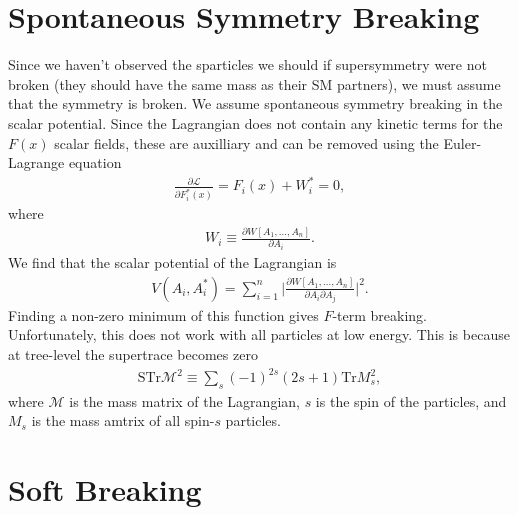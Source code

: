 \documentclass[twoside,english]{uiofysmaster}
\begin{document}
\section{Spontaneous Symmetry Breaking}

Since we haven't observed the sparticles we should if supersymmetry were not broken (they should have the same mass as their SM partners), we must assume that the symmetry is broken. We assume spontaneous symmetry breaking in the scalar potential. Since the Lagrangian does not contain any kinetic terms for the $F(x)$ scalar fields, these are auxilliary and can be removed using the Euler-Lagrange equation
\begin{align}
\frac{\partial \mathcal{L}}{\partial F_i^*(x)} = F_i(x) + W_i^* = 0,
\end{align}
where
\begin{align}
W_i \equiv \frac{\partial W[A_1,...,A_n]}{\partial A_i}.
\end{align}
We find that the scalar potential of the Lagrangian is 
\begin{align}
V(A_i, A_i^*) = \sum_{i=1}^n \Bigg| \frac{\partial W [A_1,...,A_n]}{\partial A_i \partial A_j} \Bigg|^2.
\end{align}
Finding a non-zero minimum of this function gives $F$-term breaking. Unfortunately, this does not work with all particles at low energy. This is because at tree-level the supertrace becomes zero
\begin{align}
\text{STr} \mathcal{M}^2 \equiv \sum_s (-1)^{2s} (2s+1) \text{Tr} M_s^2,
\end{align}
where $\mathcal{M}$ is the mass matrix of the Lagrangian, $s$ is the spin of the particles, and $M_s$ is the mass amtrix of all spin-$s$ particles.

\section{Soft Breaking}
\end{document}
